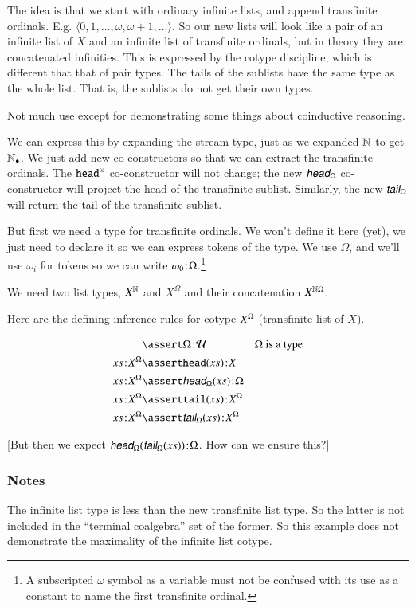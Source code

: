 The idea is that we start with ordinary infinite lists, and append
transfinite ordinals. E.g. \(\langle 0, 1, \ldots, \omega, \omega+1,
\ldots\rangle\). So our new lists will look like a pair of an infinite
list of \(X\) and an infinite list of transfinite ordinals, but in
theory they are concatenated infinities. This is expressed by the
cotype discipline, which is different that that of pair types. The
tails of the sublists have the same type as the whole list. That is,
the sublists do not get their own types.

Not much use except for demonstrating some things about coinductive
reasoning.

We can express this by expanding the stream type, just as we expanded
\(\mathbb{N}\) to get \(\mathbb{N}_{\bullet}\). We just add new co-constructors so that we
can extract the transfinite ordinals. The \(\cohead\) co-constructor
will not change; the new \(\xcohead\) co-constructor will project the
head of the transfinite sublist. Similarly, the new \(\xcotail\) will
return the tail of the transfinite sublist.

But first we need a type for transfinite ordinals. We won't define it
here (yet), we just need to declare it so we can express tokens of the
type. We use \(\Omega\), and we'll use \(\omega_{i}\) for tokens so we
can write \(\omega_0\hspace{1pt}\mathpunct{:}\hspace{-1pt}\Omega\).\footnote{A subscripted \(\omega\)
symbol as a variable must not be confused with its use as a constant
to name the first transfinite ordinal.}

\vspace{2ex}

We need two list types, \(X^{\mathbb{N}}\) and \(X^{\Omega}\) and their
concatenation \(X^{\mathbb{N}\Omega}\).

Here are the defining inference rules for cotype \({X^{\Omega}}\)
(transfinite list of \(X\)).

\begin{align}
  & \linfer \tj{\Omega}{\Univ} & \Omega\ \text{is a type} \\
  \tj{\seq{x}}{\xcolist{X}} & \linfer \tj{\head(\seq{x})}{X} & \\
  \tj{\seq{x}}{\xcolist{X}} & \linfer \tj{\xcohead(\seq{x})}{\Omega} & \\
  \tj{\seq{x}}{\xcolist{X}} & \linfer \tj{\tail(\seq{x})}{\xcolist{X}} & \\
  \tj{\seq{x}}{\xcolist{X}} & \linfer \tj{\xcotail(\seq{x})}{\xcolist{X}} &
\end{align}

[But then we expect \(\tj{\xcohead(\xcotail(\seq{x}))}{\Omega}\). How can we ensure this?]

\subsubsection{Notes}

The infinite list type is less than the new transfinite list type. So
the latter is not included in the ``terminal coalgebra'' set of the
former. So this example does not demonstrate the maximality of the
infinite list cotype.

